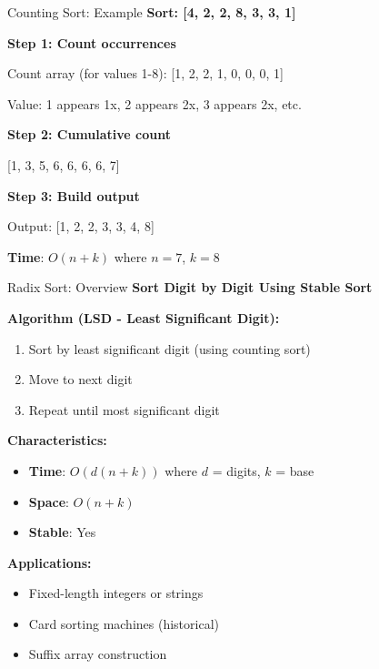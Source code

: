 \documentclass[aspectratio=169]{beamer}
\begin{document}
\begin{frame}{Counting Sort: Example}
  \textbf{Sort: [4, 2, 2, 8, 3, 3, 1]}

  \vspace{0.3cm}
  \textbf{Step 1: Count occurrences}
  \begin{center}
  Count array (for values 1-8): [1, 2, 2, 1, 0, 0, 0, 1]

  Value: 1 appears 1x, 2 appears 2x, 3 appears 2x, etc.
  \end{center}

  \vspace{0.3cm}
  \textbf{Step 2: Cumulative count}
  \begin{center}
  [1, 3, 5, 6, 6, 6, 6, 7]
  \end{center}

  \vspace{0.3cm}
  \textbf{Step 3: Build output}
  \begin{center}
  Output: [1, 2, 2, 3, 3, 4, 8]
  \end{center}

  \vspace{0.3cm}
  \textbf{Time}: $O(n + k)$ where $n=7$, $k=8$
\end{frame}

\begin{frame}{Radix Sort: Overview}
  \textbf{Sort Digit by Digit Using Stable Sort}

  \vspace{0.3cm}
  \textbf{Algorithm (LSD - Least Significant Digit):}
  \begin{enumerate}
    \item Sort by least significant digit (using counting sort)
    \item Move to next digit
    \item Repeat until most significant digit
  \end{enumerate}

  \vspace{0.3cm}
  \textbf{Characteristics:}
  \begin{itemize}
    \item \textbf{Time}: $O(d(n + k))$ where $d$ = digits, $k$ = base
    \item \textbf{Space}: $O(n + k)$
    \item \textbf{Stable}: Yes
  \end{itemize}

  \vspace{0.3cm}
  \textbf{Applications:}
  \begin{itemize}
    \item Fixed-length integers or strings
    \item Card sorting machines (historical)
    \item Suffix array construction
  \end{itemize}
\end{frame}
\end{document}
